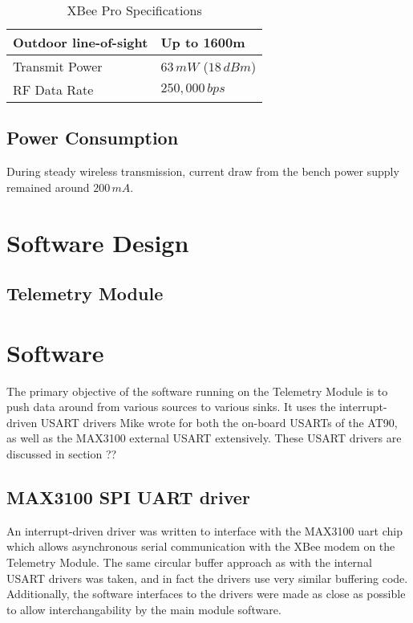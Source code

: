 %
\begin{table}
\centering{}\caption{XBee Pro Specifications}
\begin{tabular}{|l|l|}
\hline 
Outdoor line-of-sight  & Up to 1600m\tabularnewline
\hline 
Transmit Power  & $63\, mW$ ($18\, dBm$)\tabularnewline
\hline 
RF Data Rate  & $250,000\, bps$\tabularnewline
\hline
\end{tabular}
\end{table}

\subsection{Power Consumption}

During steady wireless transmission, current draw from the bench power supply remained around $200\, mA$.

\section{Software Design}

\subsection{Telemetry Module}

\section{Software}

The primary objective of the software running on the Telemetry Module is to push data around from various sources to various sinks. It uses the interrupt-driven USART drivers Mike wrote for both the on-board USARTs of the AT90, as well as the MAX3100 external USART extensively. These USART drivers are discussed in section ?? %

\subsection{MAX3100 SPI UART driver}

An interrupt-driven driver was written to interface with the MAX3100 uart chip which allows asynchronous serial communication with the XBee modem on the Telemetry Module. The same circular buffer approach as with the internal USART drivers was taken, and in fact the drivers use very similar buffering code. Additionally, the software interfaces to the drivers were made as close as possible to allow interchangability by the main module software.


